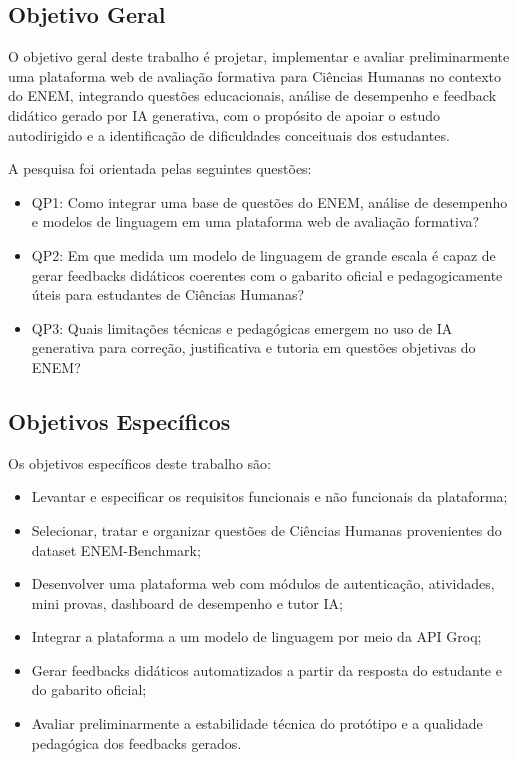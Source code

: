 \documentclass[
12pt,
openright,
oneside,
a4paper,
brazil
]{abntex2}
\begin{document}
\subsection{Objetivo Geral}

O objetivo geral deste trabalho é projetar, implementar e avaliar preliminarmente uma plataforma web de avaliação formativa para Ciências Humanas no contexto do ENEM, integrando questões educacionais, análise de desempenho e feedback didático gerado por IA generativa, com o propósito de apoiar o estudo autodirigido e a identificação de dificuldades conceituais dos estudantes.

A pesquisa foi orientada pelas seguintes questões:

\begin{itemize}
\item QP1: Como integrar uma base de questões do ENEM, análise de desempenho e modelos de linguagem em uma plataforma web de avaliação formativa?

\item QP2: Em que medida um modelo de linguagem de grande escala é capaz de gerar feedbacks didáticos coerentes com o gabarito oficial e pedagogicamente úteis para estudantes de Ciências Humanas?

\item QP3: Quais limitações técnicas e pedagógicas emergem no uso de IA generativa para correção, justificativa e tutoria em questões objetivas do ENEM?
\end{itemize}

\subsection{Objetivos Específicos}

Os objetivos específicos deste trabalho são:

\begin{itemize}
\item Levantar e especificar os requisitos funcionais e não funcionais da plataforma;
\item Selecionar, tratar e organizar questões de Ciências Humanas provenientes do dataset ENEM-Benchmark;
\item Desenvolver uma plataforma web com módulos de autenticação, atividades, mini provas, dashboard de desempenho e tutor IA;
\item Integrar a plataforma a um modelo de linguagem por meio da API Groq;
\item Gerar feedbacks didáticos automatizados a partir da resposta do estudante e do gabarito oficial;
\item Avaliar preliminarmente a estabilidade técnica do protótipo e a qualidade pedagógica dos feedbacks gerados.
\end{itemize}
\end{document}
